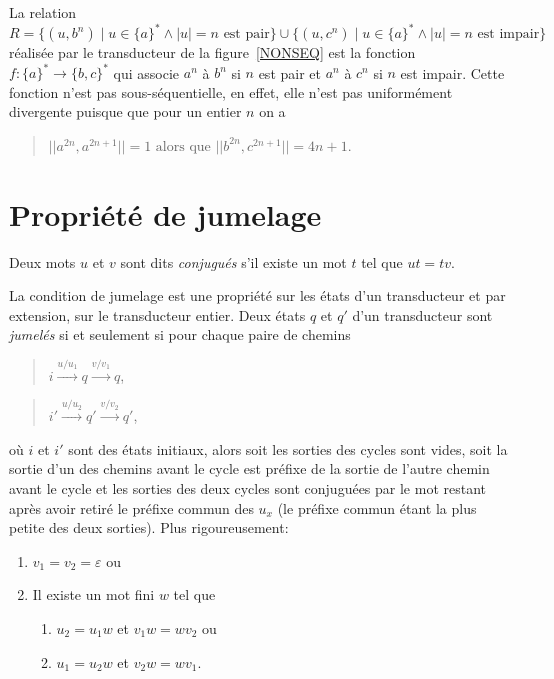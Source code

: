 	\begin{example}
		La relation $R = \{(u, b^n) \mid u \in \{a\}^* \wedge |u| = n \text{ est pair}\} \cup \{(u,c^n) \mid u \in \{a\}^* \wedge |u| = n \text{ est impair}\}$ réalisée par le transducteur de la figure~\ref{NONSEQ} est la fonction $f : \{a\}^* \to \{b, c\}^*$ qui associe $a^n$ à $b^n$ si $n$ est pair et $a^n$ à $c^n$ si $n$ est impair. Cette fonction n'est pas sous-séquentielle, en effet, elle n'est pas uniformément divergente puisque que pour un entier $n$ on a
		\begin{quotation}
			$||a^{2n}, a^{2n+1}|| = 1 \text{ alors que } ||b^{2n},c^{2n+1}|| = 4n+1$.
		\end{quotation}
		\label{NONSE}
	\end{example}
	
	
\section{Propriété de jumelage}

	\begin{definition}
		Deux mots $u$ et $v$ sont dits \emph{conjugués} s'il existe un mot $t$ tel que $ut = tv$. \\
	\end{definition}
	
	La condition de jumelage est une propriété sur les états d'un transducteur et par extension, sur le transducteur entier.
	Deux états $q$ et $q'$ d'un transducteur sont \emph{jumelés} si et seulement si pour chaque paire de chemins
	\begin{quotation}
		$i \xrightarrow{u/u_1} q \xrightarrow{v/v_1} q$,
	\end{quotation}
	\begin{quotation}
		$i' \xrightarrow{u/u_2} q' \xrightarrow{v/v_2} q'$,
	\end{quotation}
	où $i$ et $i'$ sont des états initiaux, alors soit les sorties des cycles sont vides, soit la sortie d'un des chemins avant le cycle est préfixe de la sortie de l'autre chemin avant le cycle et les sorties des deux cycles sont conjuguées par le mot restant après avoir retiré le préfixe commun des $u_x$ (le préfixe commun étant la plus petite des deux sorties). Plus rigoureusement:
	\begin{enumerate}
		\item $v_1 = v_2 = \varepsilon$ ou
		\item Il existe un mot fini $w$ tel que 
		\begin{enumerate}
			\item $u_2 = u_1w$ et $v_1w = wv_2$ ou
			\item $u_1 = u_2w$ et $v_2w = wv_1$.
		\end{enumerate}
	\end{enumerate}

